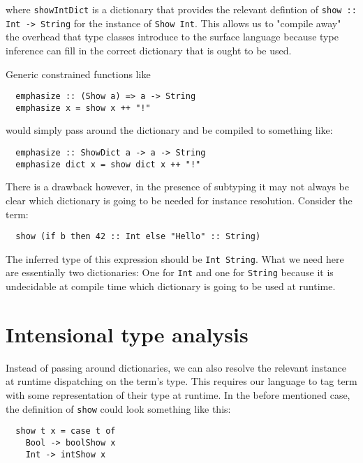 where \texttt{showIntDict} is a dictionary that provides the relevant defintion of \texttt{show :: Int -> String} for the instance of \texttt{Show Int}.
This allows us to "compile away" the overhead that type classes introduce to the surface language because type inference can fill in the correct dictionary that is ought to be used.

Generic constrained functions like

\begin{verbatim}
  emphasize :: (Show a) => a -> String
  emphasize x = show x ++ "!"
\end{verbatim}

would simply pass around the dictionary and be compiled to something like:

\begin{verbatim}
  emphasize :: ShowDict a -> a -> String
  emphasize dict x = show dict x ++ "!"
\end{verbatim}

\cite{kiselyov}

There is a drawback however, in the presence of subtyping it may not always be clear which dictionary is going to be needed for instance resolution.
Consider the term:

\begin{verbatim}
  show (if b then 42 :: Int else "Hello" :: String)
\end{verbatim}

The inferred type of this expression should be \texttt{Int \/ String}.
What we need here are essentially two dictionaries: One for \texttt{Int} and one for \texttt{String} because it is undecidable at compile time which dictionary is going to be used at runtime.

\section{Intensional type analysis}

Instead of passing around dictionaries, we can also resolve the relevant instance at runtime dispatching on the term's type.
This requires our language to tag term with some representation of their type at runtime.
In the before mentioned case, the definition of \texttt{show} could look something like this:

\begin{verbatim}
  show t x = case t of
    Bool -> boolShow x
    Int -> intShow x
\end{verbatim}

